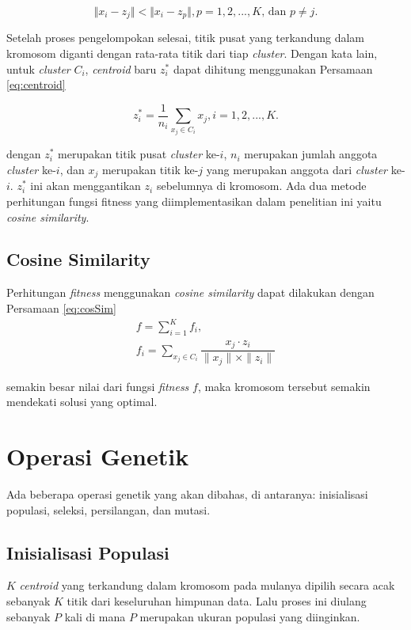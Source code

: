 \begin{equation}
\Vert x_i-z_j \Vert < \Vert x_i-z_p \Vert , p=1,2, ... ,K \mbox{, dan } p \neq j.
\end{equation}

Setelah proses pengelompokan selesai, titik pusat yang terkandung dalam kromosom diganti dengan rata-rata titik dari tiap \textit{cluster}. Dengan kata lain, untuk \textit{cluster} $C_i$, \textit{centroid} baru $z_i^*$ dapat dihitung menggunakan Persamaan \ref{eq:centroid}

\begin{equation}
\label{eq:centroid}
z_i^*=\frac{1}{n_i} \sum_{x_j\in C_i} x_j,   i=1,2, ... ,K.
\end{equation}

dengan $z_i^*$ merupakan titik pusat \textit{cluster} ke-$i$, $n_i$ merupakan jumlah anggota \textit{cluster} ke-$i$, dan $x_j$ merupakan titik ke-$j$ yang merupakan anggota dari \textit{cluster} ke-$i$. $z_i^*$ ini akan menggantikan $z_i$ sebelumnya di kromosom. Ada dua metode perhitungan fungsi fitness yang diimplementasikan dalam penelitian ini yaitu \textit{cosine similarity}.

\subsection{Cosine Similarity}
Perhitungan \textit{fitness} menggunakan \textit{cosine similarity} dapat dilakukan dengan Persamaan \ref{eq:cosSim}
\begin{equation}
\label{eq:cosSim}
	\begin{gathered}
	f=\sum_{i=1}^K f_i , \\
	f_i=\sum_{x_j\in C_i}\dfrac{x_j\cdot z_i}{\parallel x_j \parallel \times \parallel z_i \parallel}
	\end{gathered}
\end{equation}

semakin besar nilai dari fungsi \textit{fitness} $f$, maka kromosom tersebut semakin mendekati solusi yang optimal.

\section{Operasi Genetik}
Ada beberapa operasi genetik yang akan dibahas, di antaranya: inisialisasi populasi, seleksi, persilangan, dan mutasi.

\subsection{Inisialisasi Populasi}
$K$ \textit{centroid} yang terkandung dalam kromosom pada mulanya dipilih secara acak sebanyak $K$ titik dari keseluruhan himpunan data. Lalu proses ini diulang sebanyak $P$ kali di mana $P$ merupakan ukuran populasi yang diinginkan.

